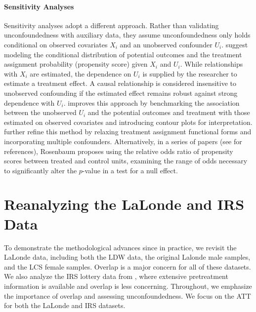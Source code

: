 \documentclass[letterpaper,12pt,leqno]{article}
\begin{document}
\paragraph{Sensitivity Analyses} 
Sensitivity analyses adopt a different approach. Rather than validating unconfoundedness with auxiliary data, they assume unconfoundedness only holds conditional on observed covariates $X_{i}$ and an unobserved confounder $U_{i}$. \citet{rosenbaum1983assessing} suggest modeling the conditional distribution of potential outcomes and the treatment assignment probability (propensity score) given $X_{i}$ and $U_{i}$. While relationships with $X_{i}$ are estimated, the dependence on $U_{i}$ is supplied by the researcher to estimate a treatment effect. A causal relationship is considered insensitive to unobserved confounding if the estimated effect remains robust against strong dependence with $U_{i}$. \citet{imbens2003} improves this approach by benchmarking the association between the unobserved  $U_{i}$ and the potential outcomes and treatment  with those estimated on observed covariates and introducing contour plots for interpretation. \cite{cinelli2020making} further refine this method by relaxing treatment assignment functional forms and incorporating multiple confounders. Alternatively, in a series of papers (see \citet{rosenbaum_book} for references), Rosenbaum proposes using the relative odds ratio of propensity scores between treated and control units, examining the range of odds necessary to significantly alter the $p$-value in a test for a null effect.


\section{Reanalyzing the LaLonde and IRS Data}\label{reanalyses}

To demonstrate the methodological advances since \citet{LaLonde} in practice, we revisit the LaLonde data, including both the LDW data, the original Lalonde male samples, and the LCS female samples. Overlap is a major concern for all of these datasets. We also analyze the IRS lottery data from \citet*{imbensrubinsacerdote}, where extensive pretreatment information is available and overlap is less concerning. Throughout, we emphasize the importance of overlap and assessing unconfoundedness. We focus on the ATT for both the LaLonde and IRS datasets.
\end{document}
